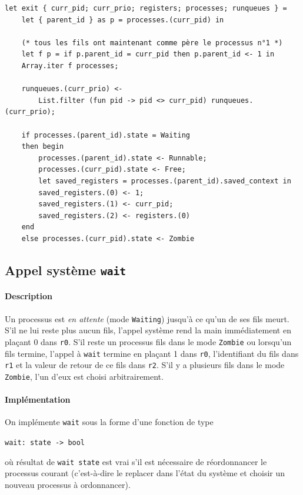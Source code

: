 \documentclass[french, toc]{../cs-classes/cs-classes}
\begin{document}
\begin{verbatim}
let exit { curr_pid; curr_prio; registers; processes; runqueues } =
    let { parent_id } as p = processes.(curr_pid) in

    (* tous les fils ont maintenant comme père le processus n°1 *)
    let f p = if p.parent_id = curr_pid then p.parent_id <- 1 in
    Array.iter f processes;

    runqueues.(curr_prio) <-
        List.filter (fun pid -> pid <> curr_pid) runqueues.(curr_prio);

    if processes.(parent_id).state = Waiting
    then begin
        processes.(parent_id).state <- Runnable;
        processes.(curr_pid).state <- Free;
        let saved_registers = processes.(parent_id).saved_context in
        saved_registers.(0) <- 1;
        saved_registers.(1) <- curr_pid;
        saved_registers.(2) <- registers.(0)
    end
    else processes.(curr_pid).state <- Zombie
\end{verbatim}

\subsection{Appel système \texttt{wait}}
\paragraph*{Description} 
Un processus est \emph{en attente} (mode \texttt{Waiting}) jusqu'à ce qu'un de ses fils meurt. S'il ne lui reste plus aucun fils, l'appel système rend la main immédiatement en plaçant 0 dans \texttt{r0}. S'il reste un processus fils dans le mode \texttt{Zombie} ou lorsqu'un fils termine, l'appel à \texttt{wait} termine en plaçant 1 dans \texttt{r0}, l'identifiant du fils dans \texttt{r1} et la valeur de retour de ce fils dans \texttt{r2}. S'il y a plusieurs fils dans le mode \texttt{Zombie}, l'un d'eux est choisi arbitrairement.

\paragraph*{Implémentation} On implémente \texttt{wait} sous la forme d'une fonction de type
\begin{center}
    \texttt{wait: state -> bool}
\end{center}
où résultat de \texttt{wait state} est vrai s’il est nécessaire de réordonnancer le processus courant (c’est-à-dire le replacer dans l’état du système et choisir un nouveau processus à ordonnancer).
\end{document}
